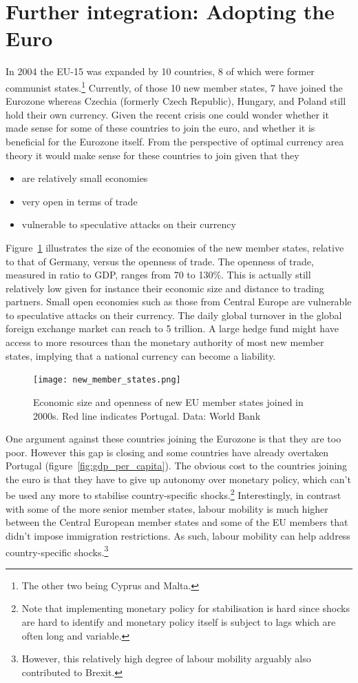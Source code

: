 \documentclass{tufte-handout}
\begin{document}
\section{Further integration: Adopting the Euro}
In 2004 the EU-15 was expanded by 10 countries, 8 of which were former communist states.\footnote{The other two being Cyprus and Malta.}
Currently, of those 10 new member states, 7 have joined the Eurozone whereas Czechia (formerly Czech Republic), Hungary, and Poland still hold their own currency. 
Given the recent crisis one could wonder whether it made sense for some of these countries to join the euro, and whether it is beneficial for the Eurozone itself. 
From the perspective of optimal currency area theory it would make sense for these countries to join given that they
\begin{itemize}
  \item are relatively small economies
  \item very open in terms of trade
  \item vulnerable to speculative attacks on their currency
\end{itemize}

Figure~\ref{fig:new_members} illustrates the size of the economies of the new member states, relative to that of Germany, versus the openness of trade. 
The openness of trade, measured in ratio to GDP, ranges from 70 to 130\%. 
This is actually still relatively low given for instance their economic size and distance to trading partners.
Small open economies such as those from Central Europe are vulnerable to speculative attacks on their currency. 
The daily global turnover in the global foreign exchange market can reach  to 5 trillion. 
A large hedge fund might have access to more resources than the monetary authority of most new member states, implying that a national currency can become a liability.
\begin{figure} \centering
    \texttt{[image: new\_member\_states.png]}
    \caption{Economic size and openness of new EU member states joined in 2000s. Red line indicates Portugal. Data: World Bank}
    \label{fig:new_members}
  \end{figure}

One argument against these countries joining the Eurozone is that they are too poor. 
However this gap is closing and some countries have already overtaken Portugal (figure~\ref{fig:gdp_per_capita}). 
The obvious cost to the countries joining the euro is that they have to give up autonomy over monetary policy, which can't be used any more to stabilise country-specific shocks.\footnote{Note that implementing monetary policy for stabilisation is hard since shocks are hard to identify and monetary policy itself is subject to lags which are often long and variable.} 
Interestingly, in contrast with some of the more senior member states, labour mobility is much higher between the Central European member states and some of the EU members that didn't impose immigration restrictions. 
As such, labour mobility can help address country-specific shocks.\footnote{However, this relatively high degree of labour mobility arguably also contributed to Brexit.}
\end{document}
